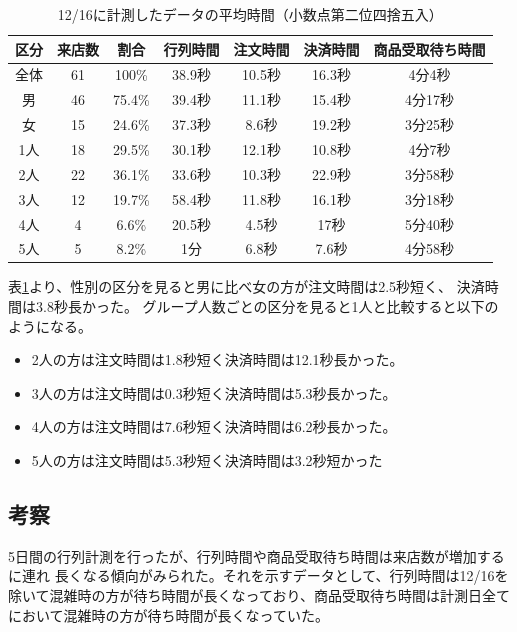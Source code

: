 \documentclass{jsarticle}
\begin{document}
\begin{table}[H]
 \begin{center}
  \caption{12/16に計測したデータの平均時間（小数点第二位四捨五入）}
    \begin{tabular}{|c|c|c|c|c|c|c|} \hline
区分 & 来店数 & 割合 & 行列時間 & 注文時間 & 決済時間 & 商品受取待ち時間 \\ \hline \hline
全体 & 61 & 100\%  & 38.9秒 & 10.5秒 & 16.3秒 & 4分4秒 \\ \hline \hline
男   & 46 & 75.4\% & 39.4秒 & 11.1秒 & 15.4秒 & 4分17秒 \\ \hline
女   & 15 & 24.6\% & 37.3秒 & 8.6秒  & 19.2秒 & 3分25秒  \\ \hline \hline
1人  & 18 & 29.5\% & 30.1秒 & 12.1秒 & 10.8秒 & 4分7秒  \\ \hline
2人  & 22 & 36.1\% & 33.6秒 & 10.3秒 & 22.9秒 & 3分58秒 \\ \hline
3人  & 12 & 19.7\% & 58.4秒 & 11.8秒 & 16.1秒 & 3分18秒 \\ \hline
4人  & 4  & 6.6\%  & 20.5秒 & 4.5秒  & 17秒   & 5分40秒 \\ \hline
5人  & 5  & 8.2\%  & 1分    & 6.8秒  & 7.6秒  & 4分58秒 \\ \hline
 \end{tabular}
 \label{table8}
 \end{center}
\end{table}

表\ref{table8}より、性別の区分を見ると男に比べ女の方が注文時間は2.5秒短く、
決済時間は3.8秒長かった。
グループ人数ごとの区分を見ると1人と比較すると以下のようになる。
\begin{itemize}
\item 2人の方は注文時間は1.8秒短く決済時間は12.1秒長かった。
\item 3人の方は注文時間は0.3秒短く決済時間は5.3秒長かった。
\item 4人の方は注文時間は7.6秒短く決済時間は6.2秒長かった。
\item 5人の方は注文時間は5.3秒短く決済時間は3.2秒短かった
\end{itemize}





\subsection{考察}
5日間の行列計測を行ったが、行列時間や商品受取待ち時間は来店数が増加するに連れ
長くなる傾向がみられた。それを示すデータとして、行列時間は12/16を除いて混雑時の方が待ち時間が長くなっており、商品受取待ち時間は計測日全てにおいて混雑時の方が待ち時間が長くなっていた。
\end{document}
